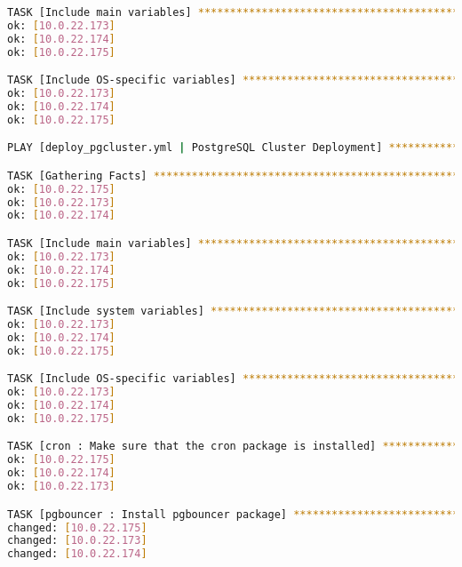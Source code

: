 \begin{flushleft}
\begin{lstlisting}[language=bash, caption=Deploy - Anhang - Deployt,captionpos=b,label={lst:deploy-appendix-deployt},breaklines=true]
TASK [Include main variables] *************************************************************************************************************************************************************************************
ok: [10.0.22.173]
ok: [10.0.22.174]
ok: [10.0.22.175]

TASK [Include OS-specific variables] ******************************************************************************************************************************************************************************
ok: [10.0.22.173]
ok: [10.0.22.174]
ok: [10.0.22.175]

PLAY [deploy_pgcluster.yml | PostgreSQL Cluster Deployment] *******************************************************************************************************************************************************

TASK [Gathering Facts] ********************************************************************************************************************************************************************************************
ok: [10.0.22.175]
ok: [10.0.22.173]
ok: [10.0.22.174]

TASK [Include main variables] *************************************************************************************************************************************************************************************
ok: [10.0.22.173]
ok: [10.0.22.174]
ok: [10.0.22.175]

TASK [Include system variables] ***********************************************************************************************************************************************************************************
ok: [10.0.22.173]
ok: [10.0.22.174]
ok: [10.0.22.175]

TASK [Include OS-specific variables] ******************************************************************************************************************************************************************************
ok: [10.0.22.173]
ok: [10.0.22.174]
ok: [10.0.22.175]

TASK [cron : Make sure that the cron package is installed] ********************************************************************************************************************************************************
ok: [10.0.22.175]
ok: [10.0.22.174]
ok: [10.0.22.173]

TASK [pgbouncer : Install pgbouncer package] **********************************************************************************************************************************************************************
changed: [10.0.22.175]
changed: [10.0.22.173]
changed: [10.0.22.174]


\end{lstlisting}
\end{flushleft}
